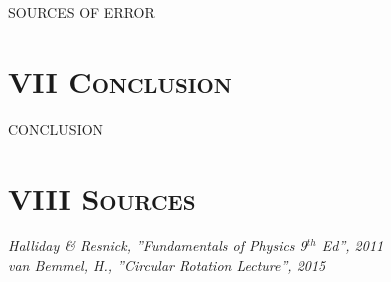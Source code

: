 \documentclass[12pt,notitlepage,twoside]{article}
\begin{document}
\begin{multicols*}{2}
                SOURCES OF ERROR
                      
                \section*{\centering\normalsize{\textsc{VII Conclusion}}}
                \fontsize{3.8mm}{1em}\selectfont
                \qquad 
                
                CONCLUSION
               
                \section*{\centering\normalsize{\textsc{VIII Sources}}}
               
                \footnotesize
                \textit{Halliday \& Resnick, ”Fundamentals of Physics 9$^{th}$ Ed”, 2011} \\
                \textit{van Bemmel, H., ”Circular Rotation Lecture”, 2015}
               
        \end{multicols*}
       
\end{document}
